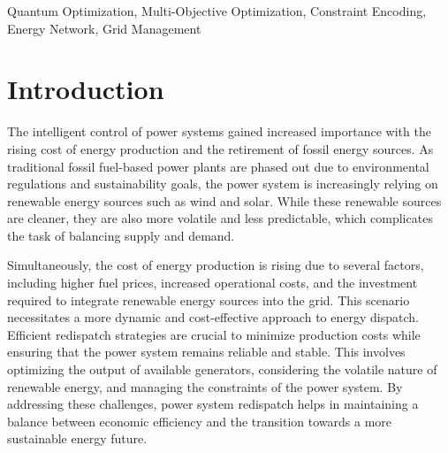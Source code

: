 \documentclass[conference]{IEEEtran}
\begin{document}
\begin{abstract}
The rising energy production costs and the increasing reliance on volatile renewable sources have driven the need for more efficient power system redispatch strategies. In this work, we re-interpret the redispatch problem as a multi-objective combinatorial optimization task within the Quadratic Unconstrained Binary Optimization (QUBO) framework, suitable for adiabatic quantum computing. Our contributions include a novel normalized unbalanced penalty method that integrates inequality constraints via a quadratic Taylor expansion and an $\alpha$-Expansion algorithm that allows us to address large-scale redispatch instances and to integrate temporal adjacent state switching constraints directly into the algorithm. Our experiments are conducted on open data of the German power system. Our results, obtained via numerical simulation and from an actual D-Wave Advantage quantum annealer, validate the viability of our formulation and demonstrate that our algorithm scales to large problem instances. 
\end{abstract}

\begin{IEEEkeywords}
Quantum Optimization, Multi-Objective Optimization, Constraint Encoding, Energy Network, Grid Management
\end{IEEEkeywords}



\section{Introduction}
\label{sec:introduction}
The intelligent control of power systems gained increased importance with the rising 
cost of energy production and the retirement of fossil energy sources. As traditional 
fossil fuel-based power plants are phased out due to environmental regulations and 
sustainability goals, the power system is increasingly relying on renewable energy sources 
such as wind and solar. While these renewable sources are cleaner, they are also more volatile 
and less predictable, which complicates the task of balancing supply and demand. 

Simultaneously, the cost of energy production is rising due to several
factors, including higher fuel prices, increased operational costs, and
the investment required to integrate renewable energy sources into the
grid. This scenario necessitates a more dynamic and cost-effective
approach to energy dispatch. Efficient redispatch strategies are crucial
to minimize production costs while ensuring that the power system
remains reliable and stable. This involves optimizing the output of
available generators, considering the volatile nature of renewable
energy, and managing the constraints of the power system.  By addressing
these challenges, power system redispatch helps in maintaining a balance
between economic efficiency and the transition towards a more
sustainable energy future.
\end{document}
